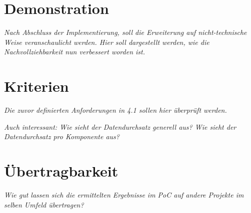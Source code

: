 
\section{Demonstration}
\label{sec:demonstration}

	\textit{Nach Abschluss der Implementierung, soll die Erweiterung auf nicht-technische Weise veranschaulicht werden. Hier soll dargestellt werden, wie die Nachvollziehbarkeit nun verbessert worden ist.}
	
\section{Kriterien}

	\textit{Die zuvor definierten Anforderungen in 4.1 sollen hier überprüft werden.}

	\textit{Auch interessant: Wie sieht der Datendurchsatz generell aus? Wie sieht der Datendurchsatz pro Komponente aus?}
	
\section{Übertragbarkeit}
\label{sec:uebertragbarkeit}

	\textit{Wie gut lassen sich die ermittelten Ergebnisse im PoC auf andere Projekte im selben Umfeld übertragen?}